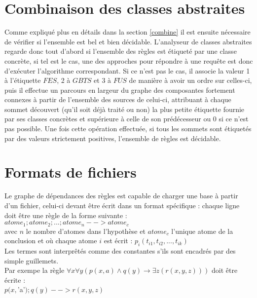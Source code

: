 \section{Combinaison des classes abstraites}\label{impl_combine}
Comme expliqué plus en détails dans la section \ref{combine} il est ensuite
nécessaire de vérifier si l'ensemble est bel et bien décidable.
L'analyseur de classes abstraites regarde donc tout d'abord si l'ensemble des règles est
étiqueté par une classe concrète, si tel est le cas, une des approches pour répondre à
une requête est donc d'exécuter l'algorithme correspondant.
Si ce n'est pas le cas, il associe la valeur 1 à l'étiquette $FES$, 
2 à $GBTS$ et 3 à $FUS$ de manière à avoir un ordre sur celles-ci, 
puis il effectue un parcours  en largeur du graphe des 
composantes fortement connexes à partir de l'ensemble des sources de celui-ci, attribuant à
chaque sommet découvert (qu'il soit déjà traité ou non) la plus petite étiquette
fournie par ses classes concrètes et supérieure à celle de son prédécesseur ou 0 si 
ce n'est pas possible.
Une fois cette opération effectuée, si tous les sommets sont étiquetés par des valeurs 
strictement positives, l'ensemble de règles est décidable.

\section{Formats de fichiers}\label{formats_fichiers}
Le graphe de dépendances des règles est capable de charger une base à partir d'un
fichier, celui-ci devant être écrit dans un format spécifique : chaque ligne doit être
une règle de la forme suivante :\\
$atome_1;atome_2;...;atome_n-->atome_c$\\
avec $n$ le nombre d'atomes dans l'hypothèse et $atome_c$ l'unique atome de la conclusion et
où chaque atome $i$ est écrit :
$p_i(t_{i1},t_{i2},...,t_{ik})$\\
Les termes sont interprêtés comme des constantes s'ils sont encadrés par des simple
guillemets.\\%
Par exempe la règle 
$\forall x \forall y (p(x,a) \wedge q(y) \rightarrow \exists z (r(x,y,z)))$ 
doit être écrite : \\
$p(x,$'a'$);q(y)-->r(x,y,z)$

